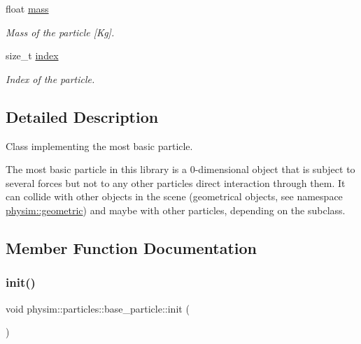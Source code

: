 \begin{DoxyCompactItemize}
float \hyperlink{classphysim_1_1particles_1_1base__particle_acb5c9f0b4a911d8981210e2cfc4dda8a}{mass}
\begin{DoxyCompactList}\small\item\em Mass of the particle \mbox{[}Kg\mbox{]}. \end{DoxyCompactList}\item 
size\+\_\+t \hyperlink{classphysim_1_1particles_1_1base__particle_a44f5de3bb4b860dfd511e28e1d6519d5}{index}
\begin{DoxyCompactList}\small\item\em Index of the particle. \end{DoxyCompactList}\end{DoxyCompactItemize}


\subsection{Detailed Description}
Class implementing the most basic particle. 

The most basic particle in this library is a 0-\/dimensional object that is subject to several forces but not to any other particle\textquotesingle{}s direct interaction through them. It can collide with other objects in the scene (geometrical objects, see namespace \hyperlink{namespacephysim_1_1geometric}{physim\+::geometric}) and maybe with other particles, depending on the subclass. 

\subsection{Member Function Documentation}
\mbox{\label{classphysim_1_1particles_1_1base__particle_a3bba517d51fd0bff7ec583e701765f87}} 
\subsubsection{\texorpdfstring{init()}{init()}}
{\footnotesize\ttfamily void physim\+::particles\+::base\+\_\+particle\+::init (\begin{DoxyParamCaption}{ }\end{DoxyParamCaption})\hspace{0.3cm}{\ttfamily [virtual]}}



